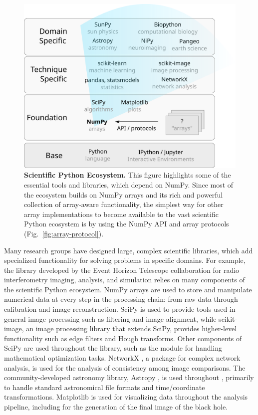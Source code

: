 \begin{figure}
  \centering
  \includegraphics[width=.45\textwidth]{static/sketches/ecosystem}
  \caption{\textbf{Scientific Python Ecosystem.}
   This figure highlights some of the essential tools and libraries, which depend
   on NumPy.  Since most of the ecosystem
   builds on NumPy arrays and its rich and powerful collection of array-aware
   functionality, the simplest way for other array implementations to become
   available to the vast scientific Python ecosystem is by using the NumPy API and array
   protocols (Fig.~\ref{fig:array-protocol}).
  }
  \label{fig:ecosystem}
\end{figure}

Many research groups have designed large,
complex scientific libraries, which add specialized functionality for
solving problems in specific domains.
For example, the  library developed by the Event Horizon Telescope 
collaboration for radio interferometry imaging, analysis, and simulation
relies on many components of the scientific Python ecosystem.
NumPy arrays are used to store and manipulate numerical data at every step
in the processing chain: from raw data through calibration and image
reconstruction.
SciPy is used to provide tools used in general image processing such as
filtering and image alignment, while scikit-image, an image processing
library that extends SciPy, provides higher-level functionality such as
edge filters and Hough transforms.
Other components of SciPy are used throughout the library, such as the
 module for handling mathematical optimization tasks.
NetworkX \cite{SciPyProceedings_11}, a package for complex
network analysis, is used for the analysis of consistency among image
comparisons.
The community-developed astronomy library, Astropy \cite{astropy:2013, astropy:2018},
is used throughout , primarily to handle standard
astronomical file formats and time/coordinate transformations.
Matplotlib is used for visualizing data throughout the analysis pipeline,
including for the generation of the final image of the black hole.

